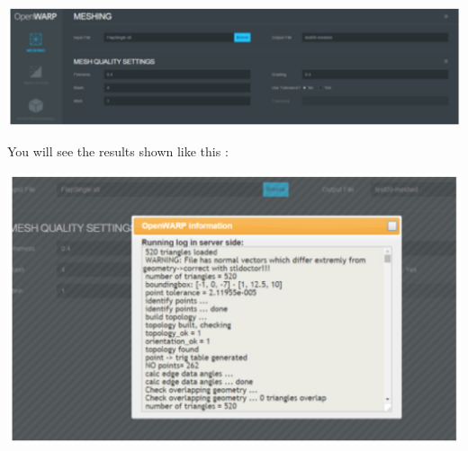 \documentclass[12pt]{article}
\begin{document}
\vspace{\abovedisplayskip}
\begin{minipage}{\linewidth}
	\centering
	\includegraphics[scale=0.5]{img/42}
\end{minipage}
\vspace{\belowdisplayskip}




You will see the results shown like this :

\vspace{\abovedisplayskip}
\begin{minipage}{\linewidth}
	\centering
	\includegraphics[scale=0.5]{img/45}
\end{minipage}
\vspace{\belowdisplayskip}



\end{document}
